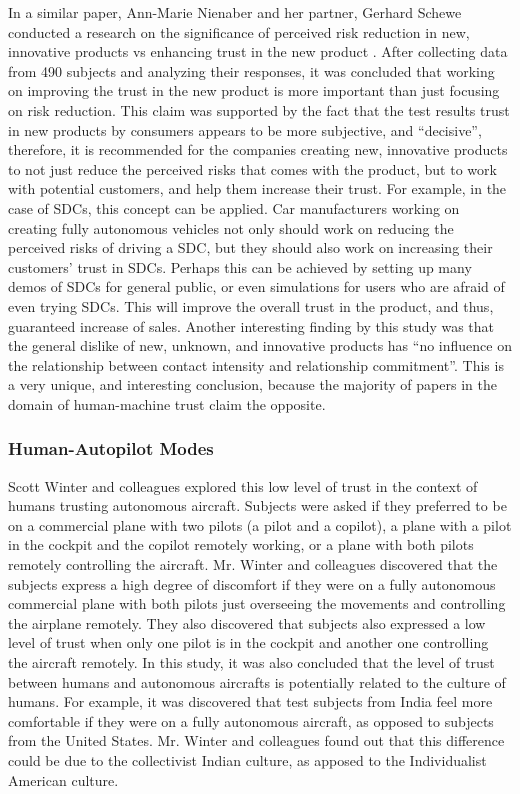 \documentclass[runningheads,a4paper]{llncs}
\begin{document}
In a similar paper, Ann-Marie Nienaber and her partner, Gerhard Schewe conducted a research on the significance of perceived risk reduction in new, innovative products vs enhancing trust in the new product \cite{nienaber2014enhancing}. After collecting data from 490 subjects and analyzing their responses, it was concluded that working on improving the trust in the new product is more important than just focusing on risk reduction. This claim was supported by the fact that the test results trust in new products by consumers appears to be more subjective, and ``decisive'', therefore, it is recommended for the companies creating new, innovative products to not just reduce the perceived risks that comes with the product, but to work with potential customers, and help them increase their trust. For example, in the case of SDCs, this concept can be applied. Car manufacturers working on creating fully autonomous vehicles not only should work on reducing the perceived risks of driving a SDC, but they should also work on increasing their customers' trust in SDCs. Perhaps this can be achieved by setting up many demos of SDCs for general public, or even simulations for users who are afraid of even trying SDCs. This will improve the overall trust in the product, and thus, guaranteed increase of sales. Another interesting finding by this study was that the general dislike of new, unknown, and innovative products has ``no influence on the
relationship between contact intensity and relationship commitment''. This is a very unique, and interesting conclusion, because the majority of papers in the domain of human-machine trust claim the opposite.

\subsubsection{Human-Autopilot Modes}
Scott Winter and colleagues \cite{winter2015indian} explored this low level of trust in the context of humans trusting autonomous aircraft. Subjects were asked if they preferred to be on a commercial plane with two pilots (a pilot and a copilot), a plane with a pilot in the cockpit and the copilot remotely working, or a plane with both pilots remotely controlling the aircraft. Mr. Winter and colleagues discovered that the subjects express a high degree of discomfort if they were on a fully autonomous commercial plane with both pilots just overseeing the movements and controlling the airplane remotely. They also discovered that subjects also expressed a low level of trust when only one pilot is in the cockpit and another one controlling the aircraft remotely. In this study, it was also concluded that the level of trust between humans and autonomous aircrafts is potentially related to the culture of humans. For example, it was discovered that test subjects from India feel more comfortable if they were on a fully autonomous aircraft, as opposed to subjects from the United States. Mr. Winter and colleagues found out that this difference could be due to the collectivist Indian culture, as apposed to the Individualist American culture.
\end{document}
